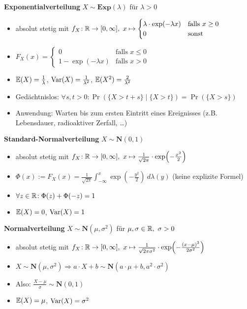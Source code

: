 \newpage
\textbf{Exponentialverteilung} $X\sim\mathbf{Exp}(\lambda)$ für $\lambda > 0$
\begin{itemize}
\item absolut stetig mit
  $f_X\!: \mathbb{R} \to [0,\infty],\ x \mapsto \begin{cases}
  \lambda \cdot \exp(-\lambda x) & \text{falls } x \geq 0	\\
  0                              & \text{sonst }
  \end{cases}$

\item
  $F_X(x) = \begin{cases}
  0                    & \text{falls } x \leq 0  \\
  1 - \exp(-\lambda x) & \text{falls } x > 0
  \end{cases}$

\item $\mathbb{E}(X) = \frac{1}{\lambda}$, $\operatorname{Var}(X) = \frac{1}{\lambda^2}$,
  $\mathbb{E}(X^2) = \frac{2}{\lambda^2}$

\item Gedächtnislos: $\forall s,t>0\!: \Pr(\{X>t+s\} \mid \{X>t\}) = \Pr(\{X>s\})$

\item Anwendung: Warten bis zum ersten Eintritt eines Ereignisses
  (z.B. Lebensdauer, radioaktiver Zerfall, \ldots)
\end{itemize}

\textbf{Standard-Normalverteilung} $X\sim\mathbf{N}(0,1)$
\begin{itemize}
\item absolut stetig mit $f_X\!: \R \to [0,\infty],\
  x \mapsto \frac{1}{\sqrt{2\pi}} \cdot \exp\left(-\frac{x^2}{2}\right)$

\item $\Phi(x) := F_X(x)=
  \frac{1}{\sqrt{2\pi}} \int_{-\infty}^{x} \exp\left(-\frac{y^2}{2}\right)~d\lambda(y)$
  (keine explizite Formel)

\item $\forall z\in\mathbb{R}\!: \Phi(z) + \Phi(-z) = 1$

\item $\mathbb{E}(X) = 0$, $\operatorname{Var}(X) = 1$

\end{itemize}

\textbf{Normalverteilung} $X\sim\mathbf{N}(\mu,\sigma^2)$ für
  $\mu,\sigma\in\mathbb{R},\ \sigma > 0$
\begin{itemize}
\item absolut stetig mit $f_X\!: \R \to [0,\infty],\
  x \mapsto \frac{1}{\sqrt{2\pi\sigma^2}} \cdot \exp\left(-\frac{(x-\mu)^2}{2\sigma^2}\right)$

\item $X\sim\mathbf{N}(\mu,\sigma^2)
  \Rightarrow a \cdot X + b \sim\mathbf{N}(a\cdot\mu+b,a^2\cdot\sigma^2)$

\item Also: $\frac{X-\mu}{\sigma} \sim \mathbf{N}(0,1)$

\item $\mathbb{E}(X) = \mu$, $\operatorname{Var}(X) = \sigma^2$
\end{itemize}

